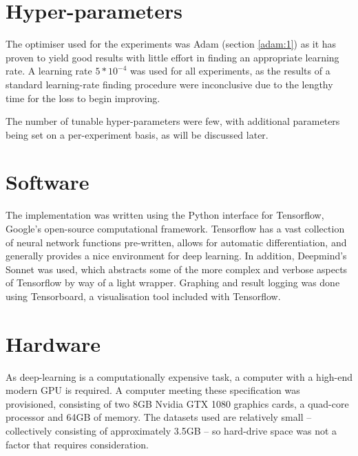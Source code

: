 \documentclass{report}
\begin{document}
\section{Hyper-parameters}
The optimiser used for the experiments was Adam (section \ref{adam:1}) as it has proven to yield good results with little effort in finding an appropriate learning rate. A learning rate $5*10^{-4}$ was used for all experiments, as the results of a standard learning-rate finding procedure were inconclusive due to the lengthy time for the loss to begin improving. \par
The number of tunable hyper-parameters were few, with additional parameters being set on a per-experiment basis, as will be discussed later. \par

\section{Software}
The implementation was written using the Python interface for Tensorflow\parencite{tensorflow}, Google's open-source computational framework. Tensorflow has a vast collection of neural network functions pre-written, allows for automatic differentiation, and generally provides a nice environment for deep learning. In addition, Deepmind's Sonnet\parencite{sonnet} was used, which abstracts some of the more complex and verbose aspects of Tensorflow by way of a light wrapper. Graphing and result logging was done using Tensorboard, a visualisation tool included with Tensorflow. \par

\section{Hardware}
As deep-learning is a computationally expensive task, a computer with a high-end modern GPU is required. A computer meeting these specification was provisioned, consisting of two 8GB Nvidia GTX 1080 graphics cards, a quad-core processor and 64GB of memory. The datasets used are relatively small -- collectively consisting of approximately 3.5GB -- so hard-drive space was not a factor that requires consideration.  \par
\end{document}
